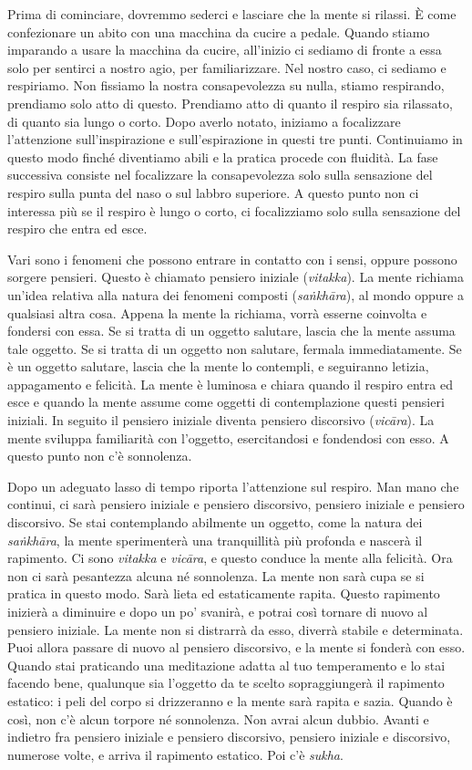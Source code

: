 Prima di cominciare, dovremmo sederci e lasciare che la mente si
rilassi. È come confezionare un abito con una macchina da cucire a
pedale. Quando stiamo imparando a usare la macchina da cucire,
all'inizio ci sediamo di fronte a essa solo per sentirci a nostro agio,
per familiarizzare. Nel nostro caso, ci sediamo e respiriamo. Non
fissiamo la nostra consapevolezza su nulla, stiamo respirando, prendiamo
solo atto di questo. Prendiamo atto di quanto il respiro sia rilassato,
di quanto sia lungo o corto. Dopo averlo notato, iniziamo a focalizzare
l'attenzione sull'inspirazione e sull'espirazione in questi tre punti.
Continuiamo in questo modo finché diventiamo abili e la pratica procede
con fluidità. La fase successiva consiste nel focalizzare la
consapevolezza solo sulla sensazione del respiro sulla punta del naso o
sul labbro superiore. A questo punto non ci interessa più se il respiro
è lungo o corto, ci focalizziamo solo sulla sensazione del respiro che
entra ed esce.

Vari sono i fenomeni che possono entrare in contatto con i sensi, oppure
possono sorgere pensieri. Questo è chiamato pensiero iniziale
(\emph{vitakka}). La mente richiama un'idea relativa alla natura dei
fenomeni composti (\emph{saṅkhāra}), al mondo oppure a qualsiasi altra
cosa. Appena la mente la richiama, vorrà esserne coinvolta e fondersi
con essa. Se si tratta di un oggetto salutare, lascia che la mente
assuma tale oggetto. Se si tratta di un oggetto non salutare, fermala
immediatamente. Se è un oggetto salutare, lascia che la mente lo
contempli, e seguiranno letizia, appagamento e felicità. La mente è
luminosa e chiara quando il respiro entra ed esce e quando la mente
assume come oggetti di contemplazione questi pensieri iniziali. In
seguito il pensiero iniziale diventa pensiero discorsivo
(\emph{vicāra}). La mente sviluppa familiarità con l'oggetto,
esercitandosi e fondendosi con esso. A questo punto non c'è sonnolenza.

Dopo un adeguato lasso di tempo riporta l'attenzione sul respiro. Man
mano che continui, ci sarà pensiero iniziale e pensiero discorsivo,
pensiero iniziale e pensiero discorsivo. Se stai contemplando abilmente
un oggetto, come la natura dei \emph{saṅkhāra}, la mente sperimenterà
una tranquillità più profonda e nascerà il rapimento. Ci sono
\emph{vitakka} e \emph{vicāra}, e questo conduce la mente alla felicità.
Ora non ci sarà pesantezza alcuna né sonnolenza. La mente non sarà cupa
se si pratica in questo modo. Sarà lieta ed estaticamente rapita. Questo
rapimento inizierà a diminuire e dopo un po' svanirà, e potrai così
tornare di nuovo al pensiero iniziale. La mente non si distrarrà da
esso, diverrà stabile e determinata. Puoi allora passare di nuovo al
pensiero discorsivo, e la mente si fonderà con esso. Quando stai
praticando una meditazione adatta al tuo temperamento e lo stai facendo
bene, qualunque sia l'oggetto da te scelto sopraggiungerà il rapimento
estatico: i peli del corpo si drizzeranno e la mente sarà rapita e
sazia. Quando è così, non c'è alcun torpore né sonnolenza. Non avrai
alcun dubbio. Avanti e indietro fra pensiero iniziale e pensiero
discorsivo, pensiero iniziale e discorsivo, numerose volte, e arriva il
rapimento estatico. Poi c'è \emph{sukha}.

